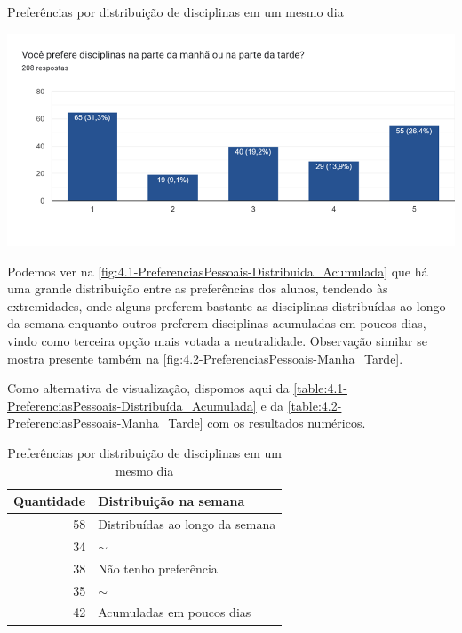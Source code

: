 \begin{MyCenteredFigure}
  \caption{Preferências por distribuição de disciplinas em um mesmo dia}
  \label{fig:4.2-PreferenciasPessoais-Manha_Tarde}
  \includegraphics[width=\textwidth]{files/img/Forms/4.2-PreferenciasPessoais-Manha_Tarde}
\end{MyCenteredFigure} %

Podemos ver na \autoref{fig:4.1-PreferenciasPessoais-Distribuida_Acumulada} que há uma grande distribuição entre as preferências dos alunos, tendendo às extremidades, onde alguns preferem bastante as disciplinas distribuídas ao longo da semana enquanto outros preferem disciplinas acumuladas em poucos dias, vindo como terceira opção mais votada a neutralidade. Observação similar se mostra presente também na \autoref{fig:4.2-PreferenciasPessoais-Manha_Tarde}.

Como alternativa de visualização, dispomos aqui da \autoref{table:4.1-PreferenciasPessoais-Distribuída_Acumulada} e da \autoref{table:4.2-PreferenciasPessoais-Manha_Tarde} com os resultados numéricos.

\begin{table}[htbp]\centering
  \caption{Preferências por distribuição de disciplinas em um mesmo dia}
  \label{table:4.1-PreferenciasPessoais-Distribuída_Acumulada}
  \begin{tabular}{| r l |}
    \hline
    \textbf{Quantidade} & \textbf{Distribuição na semana} \\
    \hline
    58                  & Distribuídas ao longo da semana \\
    34                  & $\sim$                          \\
    38                  & Não tenho preferência           \\
    35                  & $\sim$                          \\
    42                  & Acumuladas em poucos dias       \\
    \hline
  \end{tabular}
\end{table}


